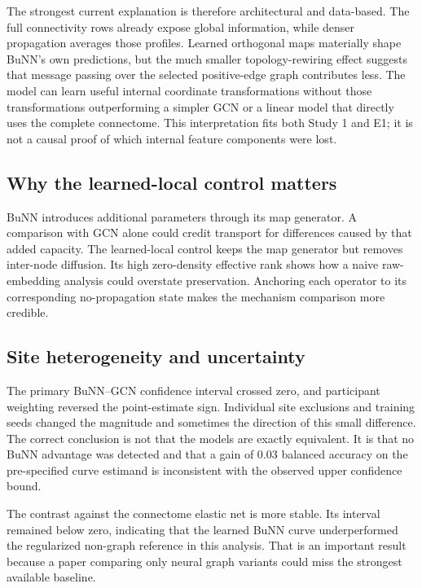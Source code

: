 \documentclass[11pt,a4paper]{article}
\begin{document}
The strongest current explanation is therefore architectural and data-based.
The full connectivity rows already expose global information, while denser
propagation averages those profiles. Learned orthogonal maps materially shape
BuNN's own predictions, but the much smaller topology-rewiring effect suggests
that message passing over the selected positive-edge graph contributes less.
The model can learn useful internal coordinate transformations without those
transformations outperforming a simpler GCN or a linear model that directly
uses the complete connectome. This interpretation fits both Study 1 and E1;
it is not a causal proof of which internal feature components were lost.

\subsection{Why the learned-local control matters}

BuNN introduces additional parameters through its map generator. A comparison
with GCN alone could credit transport for differences caused by that added
capacity. The learned-local control keeps the map generator but removes
inter-node diffusion. Its high zero-density effective rank shows how a naive
raw-embedding analysis could overstate preservation. Anchoring each operator
to its corresponding no-propagation state makes the mechanism comparison more
credible.

\subsection{Site heterogeneity and uncertainty}

The primary BuNN--GCN confidence interval crossed zero, and participant
weighting reversed the point-estimate sign. Individual site exclusions and
training seeds changed the magnitude and sometimes the direction of this
small difference. The correct conclusion is not that the models are exactly
equivalent. It is that no BuNN advantage was detected and that a gain of 0.03
balanced accuracy on the pre-specified curve estimand is inconsistent with
the observed upper confidence bound.

The contrast against the connectome elastic net is more stable. Its interval
remained below zero, indicating that the learned BuNN curve underperformed the
regularized non-graph reference in this analysis. That is an important result
because a paper comparing only neural graph variants could miss the strongest
available baseline.
\end{document}
